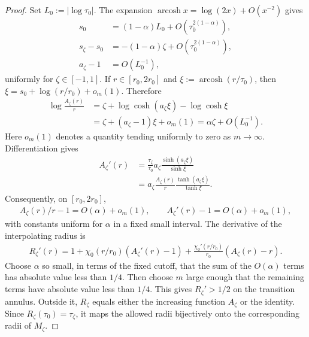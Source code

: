 \documentclass[a4paper,11pt,oneside,reqno]{amsart}
\numberwithin{equation}{section}
\theoremstyle{definition}
\begin{document}
\begin{proof}
    Set $L_0:=|\log\tau_0|$. The expansion
    $\operatorname{arcosh}x=\log(2x)+O(x^{-2})$ gives
    \begin{align*}
        s_0&=(1-\alpha)L_0+O(\tau_0^{2(1-\alpha)}),\\
        s_\zeta-s_0
        &=-(1-\alpha)\zeta+O(\tau_0^{2(1-\alpha)}),\\
        a_\zeta-1&=O(L_0^{-1}),
    \end{align*}
    uniformly for $\zeta\in[-1,1]$. If $r\in[r_0,2r_0]$
    and $\xi:=\operatorname{arcosh}(r/\tau_0)$, then
    $\xi=s_0+\log(r/r_0)+o_m(1)$. Therefore
    \begin{align*}
        \log\frac{A_\zeta(r)}r
        &=\zeta+\log\cosh(a_\zeta\xi)-\log\cosh\xi\\
        &=\zeta+(a_\zeta-1)\xi+o_m(1)
          =\alpha\zeta+O(L_0^{-1}).
    \end{align*}
    Here $o_m(1)$ denotes a quantity tending uniformly to zero
    as $m\to\infty$. Differentiation gives
    \begin{align*}
        A_\zeta'(r)
        &=\frac{\tau_\zeta}{\tau_0}
             a_\zeta\frac{\sinh(a_\zeta\xi)}{\sinh\xi}\\
        &=a_\zeta\frac{A_\zeta(r)}r
             \frac{\tanh(a_\zeta\xi)}{\tanh\xi}.
    \end{align*}
    Consequently, on $[r_0,2r_0]$,
    \begin{align*}
        A_\zeta(r)/r-1=O(\alpha)+o_m(1),
        \qquad A_\zeta'(r)-1=O(\alpha)+o_m(1),
    \end{align*}
    with constants uniform for $\alpha$ in a fixed small
    interval. The derivative of the interpolating radius is
    \begin{align*}
        R_\zeta'(r)
        =1+\chi_0(r/r_0)(A_\zeta'(r)-1)
           +\frac{\chi_0'(r/r_0)}{r_0}(A_\zeta(r)-r).
    \end{align*}
    Choose $\alpha$ so small, in terms of the fixed cutoff,
    that the sum of the $O(\alpha)$ terms has absolute value
    less than $1/4$. Then choose $m$ large enough that the
    remaining terms have absolute value less than $1/4$.
    This gives $R_\zeta'>1/2$ on the transition annulus.
    Outside it, $R_\zeta$ equals either the increasing function
    $A_\zeta$ or the identity. Since
    $R_\zeta(\tau_0)=\tau_\zeta$, it maps the allowed radii
    bijectively onto the corresponding radii of $M_\zeta$.


\end{proof}
\end{document}

